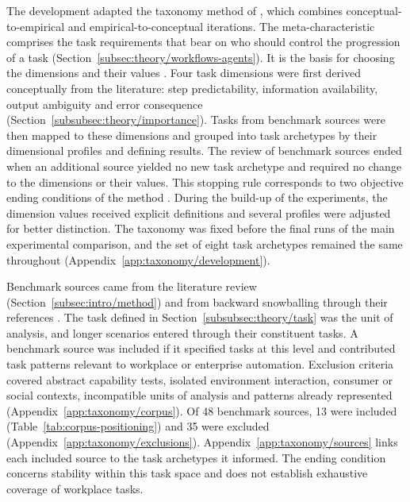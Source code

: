 The development adapted the taxonomy method of \textcite{nickersonMethodTaxonomyDevelopment2013}, which combines conceptual-to-empirical and empirical-to-conceptual iterations. The meta-\hspace{0pt}characteristic comprises the task requirements that bear on who should control the progression of a task (Section~\ref{subsec:theory/workflows-agents}). It is the basis for choosing the dimensions and their values \parencite[p.~343]{nickersonMethodTaxonomyDevelopment2013}. Four task dimensions were first derived conceptually from the literature: step predictability, information availability, output ambiguity and error consequence (Section~\ref{subsubsec:theory/importance}). Tasks from benchmark sources were then mapped to these dimensions and grouped into task archetypes by their dimensional profiles and defining results. The review of benchmark sources ended when an additional source yielded no new task archetype and required no change to the dimensions or their values. This stopping rule corresponds to two objective ending conditions of the method \parencite[p.~344]{nickersonMethodTaxonomyDevelopment2013}. During the build-up of the experiments, the dimension values received explicit definitions and several profiles were adjusted for better distinction. The taxonomy was fixed before the final runs of the main experimental comparison, and the set of eight task archetypes remained the same throughout (Appendix~\ref{app:taxonomy/development}).

Benchmark sources came from the literature review (Section~\ref{subsec:intro/method}) and from backward snowballing through their references \parencite{wohlinGuidelinesSnowballingSystematic2014}. The task defined in Section~\ref{subsubsec:theory/task} was the unit of analysis, and longer scenarios entered through their constituent tasks. A benchmark source was included if it specified tasks at this level and contributed task patterns relevant to workplace or enterprise automation. Exclusion criteria covered abstract capability tests, isolated environment interaction, consumer or social contexts, incompatible units of analysis and patterns already represented (Appendix~\ref{app:taxonomy/corpus}). Of 48 benchmark sources, 13 were included (Table~\ref{tab:corpus-positioning}) and 35 were excluded (Appendix~\ref{app:taxonomy/exclusions}). Appendix~\ref{app:taxonomy/sources} links each included source to the task archetypes it informed. The ending condition concerns stability within this task space and does not establish exhaustive coverage of workplace tasks.

